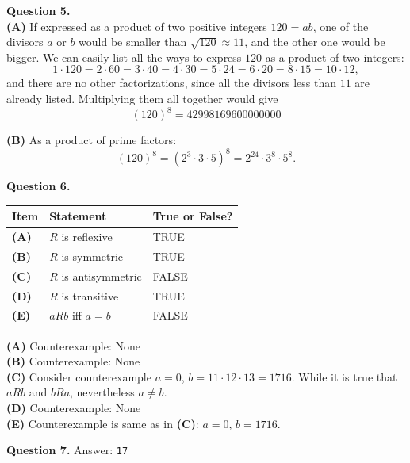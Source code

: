 \documentclass[jou]{apa6}
\begin{document}
\vspace{10pt}
{\bf Question 5.}\\
{\bf (A)} If expressed as a product of two positive integers $120 = ab$, 
one of the divisors $a$ or $b$ would be smaller than $\sqrt{120} \approx 11$, and the other
one would be bigger. We can easily list all the ways to express $120$ 
as a product of two integers: 
$$1 \cdot 120 = 2 \cdot 60 = 3 \cdot 40 = 4 \cdot 30 = 5 \cdot 24 = 6 \cdot 20 = 8 \cdot 15 = 10 \cdot 12,$$
and there are no other factorizations, since all the divisors less than $11$ are
already listed.  
Multiplying them all together would give 
$$(120)^8 = 42998169600000000$$

{\bf (B)} As a product of prime factors:
$$(120)^8 = (2^3 \cdot 3 \cdot 5)^8 = 2^{24} \cdot 3^8 \cdot 5^8.$$




\vspace{10pt}
{\bf Question 6.}\\

\begin{tabular}{|l|l|l|} \hline
{\bf Item} & {\bf Statement} & {\bf True or False?} \\ \hline
{\bf (A)} & $R$ is reflexive & TRUE \\ \hline
{\bf (B)} & $R$ is symmetric & TRUE \\ \hline
{\bf (C)} & $R$ is antisymmetric & FALSE \\ \hline
{\bf (D)} & $R$ is transitive & TRUE \\ \hline
{\bf (E)} & $aRb$ iff $a=b$ & FALSE \\ \hline
\end{tabular}


{\bf (A)} Counterexample: None\\
{\bf (B)} Counterexample: None\\
{\bf (C)} Consider counterexample $a=0$, $b = 11 \cdot 12 \cdot 13 = 1716$.  
While it is true that $aRb$ and $bRa$, nevertheless $a \neq b$.\\
{\bf (D)} Counterexample: None\\
{\bf (E)} Counterexample is same as in {\bf (C)}: $a=0$, $b = 1716$.



\vspace{10pt}
{\bf Question 7.} Answer: {\tt 17}\\
\end{document}
